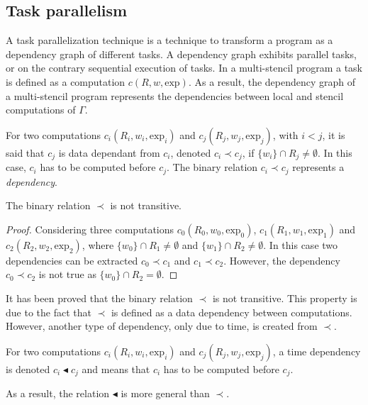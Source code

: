 \subsection{Task parallelism}
A task parallelization technique is a technique to transform a program as a dependency graph of different tasks. A dependency graph exhibits parallel tasks, or on the contrary sequential execution of tasks. In a multi-stencil program a task is defined as a computation $c(R,w,\text{exp})$. As a result, the dependency graph of a multi-stencil program represents the dependencies between local and stencil computations of $\Gamma$.

\begin{mydef}
For two computations $c_i(R_i,w_i,\text{exp}_i)$ and $c_j(R_j,w_j,\text{exp}_j)$, with $i < j$, it is said that $c_j$ is data dependant from $c_i$, denoted $c_i\prec c_j$, if $\{w_i\} \cap R_j \neq \emptyset$. In this case, $c_i$ has to be computed before $c_j$. The binary relation $c_i\prec c_j$ represents a \textit{dependency}.
\end{mydef}

\begin{myprop}
The binary relation $\prec$ is not transitive. 
\end{myprop}

\begin{proof}
Considering three computations $c_0(R_0,w_0,\text{exp}_0)$, $c_1(R_1,w_1,\text{exp}_1)$ and $c_2(R_2,w_2,\text{exp}_2)$, where $\{w_0\}\cap R_1 \neq \emptyset$ and $\{w_1\}\cap R_2 \neq \emptyset$. In this case two dependencies can be extracted $c_0 \prec c_1$ and $c_1 \prec c_2$. However, the dependency $c_0 \prec c_2$ is not true as $\{w_0\}\cap R_2 = \emptyset$.
\end{proof}

It has been proved that the binary relation $\prec$ is not transitive. This property is due to the fact that $\prec$ is defined as a data dependency between computations. However, another type of dependency, only due to time, is created from $\prec$.

\begin{mydef}
For two computations $c_i(R_i,w_i,\text{exp}_i)$ and $c_j(R_j,w_j,\text{exp}_j)$, a time dependency is denoted $c_i \blacktriangleleft c_j$ and means that $c_i$ has to be computed before $c_j$.
\end{mydef}

As a result, the relation $\blacktriangleleft$ is more general than $\prec$.

